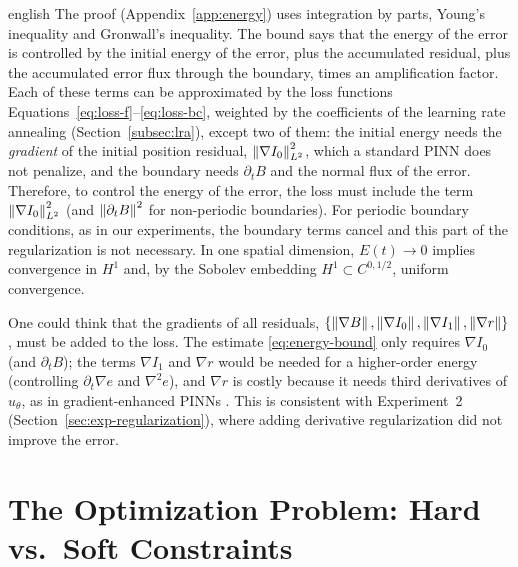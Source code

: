 \begin{hyphenrules}{english}
The proof (Appendix~\ref{app:energy}) uses integration by parts, Young's inequality and Gronwall's inequality.
The bound says that the energy of the error is controlled by the initial energy of the error, plus the
accumulated residual, plus the accumulated error flux through the boundary, times an amplification
factor. Each of these terms can be approximated by the loss functions
Equations~\eqref{eq:loss-f}--\eqref{eq:loss-bc}, weighted by the coefficients of the learning rate annealing
(Section~\ref{subsec:lra}), except two of them: the initial energy needs the \emph{gradient} of the initial
position residual, $\left\lVert \nabla I_0 \right\rVert^2_{L^2}$, which a standard PINN does not penalize, and the boundary
needs $\partial_tB$ and the normal flux of the error. Therefore, to control the energy of the error, the
loss must include the term $\left\lVert \nabla I_0 \right\rVert^2_{L^2}$ (and $\left\lVert \partial_tB \right\rVert^2$ for non-periodic
boundaries). For periodic boundary conditions, as in our experiments, the boundary terms cancel and this
part of the regularization is not necessary. In one spatial dimension, $E(t)\to0$ implies convergence
in $H^1$ and, by the Sobolev embedding $H^1\subset C^{0,1/2}$, uniform convergence.

\begin{remarkbox}
One could think that the gradients of all residuals,
$\{\left\lVert \nabla B \right\rVert,\left\lVert \nabla I_0 \right\rVert,\left\lVert \nabla I_1 \right\rVert,\left\lVert \nabla r \right\rVert\}$, must be added to the loss.
The estimate \eqref{eq:energy-bound} only requires $\nabla I_0$ (and $\partial_tB$); the terms
$\nabla I_1$ and $\nabla r$ would be needed for a higher-order energy (controlling $\partial_t\nabla e$
and $\nabla^2e$), and $\nabla r$ is costly because it needs third derivatives of $u_\theta$, as in
gradient-enhanced PINNs \cite{yu2022gpinn}. This is consistent with Experiment~2
(Section~\ref{sec:exp-regularization}), where adding derivative regularization did not improve the error.
\end{remarkbox}

\section{The Optimization Problem: Hard vs.\ Soft Constraints}\label{sec:optimization}


\end{hyphenrules}

